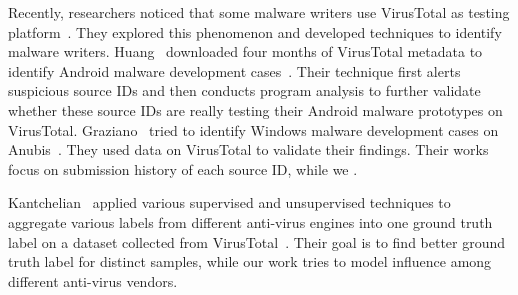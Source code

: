 Recently, researchers noticed that some malware writers use VirusTotal as testing platform~\cite{huangvt2016bigdata, neeles}.
They explored this phenomenon and developed techniques to identify malware writers. 
Huang \etal\ downloaded four months of VirusTotal metadata to identify Android malware development cases~\citet{huangvt2016bigdata}. 
Their technique first alerts suspicious source IDs 
and then conducts program analysis to further validate whether 
these source IDs are really testing their Android malware prototypes on VirusTotal. 
Graziano \etal\ tried to identify Windows malware development cases on Anubis~\citet{neeles}. 
They used data on VirusTotal to validate their findings. 
Their works focus on submission history of each source ID, 
while we .  

Kantchelian \etal\ applied various supervised and unsupervised 
techniques to aggregate various labels from different anti-virus engines into one ground truth label 
on a dataset collected from VirusTotal~\citet{betterGT}. 
Their goal is to find better ground truth label for distinct samples, 
while our work tries to model influence among different anti-virus vendors.  


